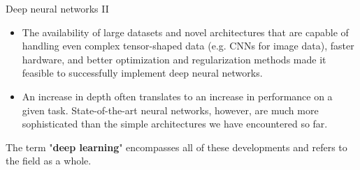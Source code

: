 \documentclass[11pt,compress,t,notes=noshow, xcolor=table]{beamer}
\begin{document}
\begin{framei}[sep=L]{Deep neural networks II}

\begin{itemize}
\item The availability of large datasets and novel architectures that are capable of handling even complex tensor-shaped data (e.g. CNNs for image data), faster hardware, and better optimization and regularization methods made it feasible to successfully implement deep neural networks.%

\item An increase in depth often translates to an increase in performance on a given task. State-of-the-art neural networks, however, are much more sophisticated than the simple architectures we have encountered so far.
\end{itemize}

\item The term "\textbf{deep learning}" encompasses all of these developments and refers to the field as a whole.
\end{framei}

\endlecture
\end{document}
